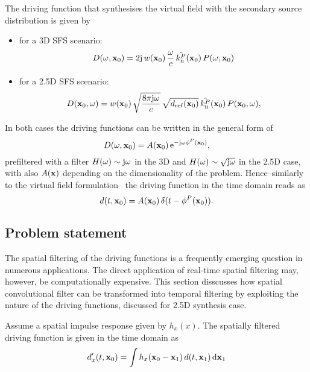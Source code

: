 \documentclass[12pt,a4paper]{article}
\begin{document}
The driving function that synthesises the virtual field with the secondary source distribution is given by
\begin{itemize}
    \item for a 3D SFS scenario:
     \begin{equation}
        D(\omega, \mathbf{x}_0) = 2 \mathrm{j} \, w(\mathbf{x}_0) \, \frac{\omega}{c} \, \hat{k_\mathrm{n}^P}(\mathbf{x}_0) \, P(\omega,\mathbf{x}_0) 
     \end{equation}
    \item for a 2.5D SFS scenario:
    \begin{equation}
        D(\mathbf{x}_0, \omega) = w(\mathbf{x}_0) \,
        \sqrt{ \frac{8\pi \mathrm{j} \omega}{c} } \, \sqrt{d_{\mathrm{ref}}(\mathbf{x}_0)} \,
        \hat{k_\mathrm{n}^P} (\mathbf{x}_0)\, P(\mathbf{x}_0,\omega),
     \end{equation}
\end{itemize}
In both cases the driving functions can be written in the general form of 
\begin{equation}
    D(\omega, \mathbf{x}_0) = A(\mathbf{x}_0) \, \mathrm{e}^{-\mathrm{j} \omega \phi^P(\mathbf{x}_0) },
 \end{equation}
 prefiltered with a filter $H(\omega) \sim \mathrm{j} \omega$ in the 3D and $H(\omega) \sim \sqrt{\mathrm{j} \omega}$ in the 2.5D case, with also $A(\mathbf{x})$ depending on the dimensionality of the problem.
 Hence--similarly to the virtual field formulation-- the driving function in the time domain reads as
 \begin{equation}
   d(t, \mathbf{x}_0) = A(\mathbf{x}_0) \, \delta( t-  \phi^P(\mathbf{x}_0) ).
   \label{eq:general_driv_fun}
 \end{equation}
 
\subsection{Problem statement}

The spatial filtering of the driving functions is a frequently emerging question in numerous applications.
The direct application of real-time spatial filtering may, however, be computationally expensive.
This section disscusses how spatial convolutional filter can be transformed into temporal filtering by exploiting the nature of the driving functions, discussed for 2.5D synthesis case.

Assume a spatial impulse response given by $h_x(x)$.
The spatially filtered driving function is given in the time domain as 
\begin{equation}
    d'_x(t,\mathbf{x}_0) = \int h_x(\mathbf{x}_0 - \mathbf{x}_1) \, d(t, \mathbf{x}_1) \, \mathrm{d} \mathbf{x}_1 
    \label{eq:d_filt}
\end{equation}
\end{document}
